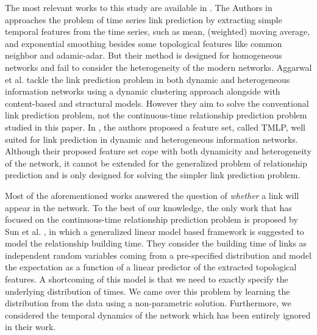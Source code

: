 The most relevant works to this study are available in \cite{hajibagheri2016leveraging, aggarwal2012dynamic, sett2017temporal, sun2012will}. The Authors in \cite{hajibagheri2016leveraging} approaches the problem of time series link prediction by extracting simple temporal features from the time series, such as mean, (weighted) moving average, and exponential smoothing besides some topological features like common neighbor and adamic-adar. But their method is designed for homogeneous networks and fail to consider the heterogeneity of the modern networks. Aggarwal et al. \cite{aggarwal2012dynamic} tackle the link prediction problem in both dynamic and heterogeneous information networks using a dynamic clustering approach alongside with content-based and structural models. However they aim to solve the conventional link prediction problem, not the continuous-time relationship prediction problem studied in this paper. In \cite{sett2017temporal}, the authors proposed a feature set, called TMLP, well suited for link prediction in dynamic and heterogeneous information networks. Although their proposed feature set cope with both dynamicity and heterogeneity of the network, it cannot be extended for the generalized problem of relationship prediction and is only designed for solving the simpler link prediction problem.

Most of the aforementioned works answered the question of \emph{whether} a link will appear in the network. To the best of our knowledge, the only work that has focused on the continuous-time relationship prediction problem is proposed by Sun et al. \cite{sun2012will}, in which a generalized linear model based framework is suggested to model the relationship building time. They consider the building time of links as independent random variables coming from a pre-specified distribution and model the expectation as a function of a linear predictor of the extracted topological features. A shortcoming of this model is that we need to exactly specify the underlying distribution of times. We came over this problem by learning the distribution from the data using a non-parametric solution. Furthermore, we considered the temporal dynamics of the network which has been entirely ignored in their work.

